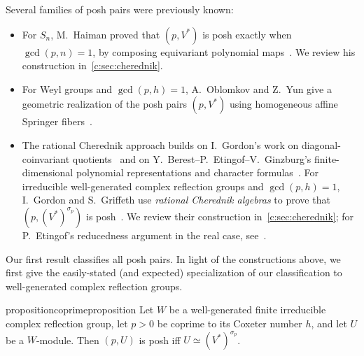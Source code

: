 \documentclass[10pt,a4paper]{amsart}
\theoremstyle{definition}
\begin{document}
Several families of posh pairs were previously known:
\begin{itemize}
\item For $S_n$, M.~Haiman proved that $(p,V^*)$ is posh exactly when
$\gcd(p,n)=1$, by composing equivariant polynomial maps~\cite{Haiman}.
We review his construction in~\cref{c:sec:cherednik}.
\item For Weyl groups and $\gcd(p,h)=1$, A.~Oblomkov and Z.~Yun give
a geometric realization of the posh pairs $(p,V^*)$ using homogeneous affine Springer fibers~\cite{OblomkovYun}.
\item The rational Cherednik approach builds on I.~Gordon's work on
diagonal-coinvariant quotients~\cite{GordonDiagonal} and on
Y.~Berest--P.~Etingof--V.~Ginzburg's finite-dimensional polynomial
representations and character formulas~\cite{BEGFinite}.
For irreducible well-generated complex reflection groups and $\gcd(p,h)=1$,
I.~Gordon and S.~Griffeth use \emph{rational Cherednik algebras} to prove
that $(p,(V^*)^{\sigma_p})$ is posh~\cite[Theorem 2.11 and Section 2.18]{GG}.
We review their construction in~\cref{c:sec:cherednik}; for P.~Etingof's
reducedness argument in the real case, see~\cite[Section~12]{ARR}. %
\end{itemize}

Our first result classifies all posh pairs.  In light of the constructions above, we first give the easily-stated (and expected) specialization of our classification to well-generated complex reflection groups.

\begin{restatable}{proposition}{coprimeproposition}\label{prop:coprime-hsop}
Let $W$ be a well-generated finite irreducible complex reflection group,
let $p>0$ be coprime to its Coxeter number $h$, and let $U$ be a
$W$-module. Then $(p,U)$ is posh iff $U\simeq(V^*)^{\sigma_p}$.
\end{restatable}
\end{document}
